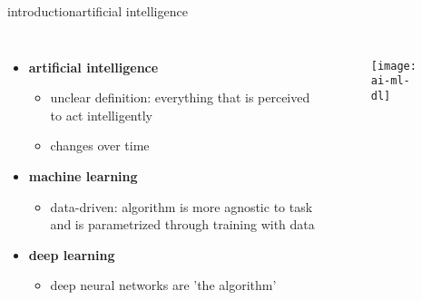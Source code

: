 \begin{frame}{introduction}{artificial intelligence}
    \vspace{-3mm}
    \begin{columns}
        \begin{itemize}
            \item \textbf{artificial intelligence}
                \begin{itemize}
                    \item unclear definition: everything that is perceived to act intelligently
                    \item   changes over time
                \end{itemize}
            \bigskip
            \item \textbf{machine learning}
                \begin{itemize}
                    \item   data-driven: algorithm is more agnostic to task and is parametrized through training with data
                \end{itemize}
            \bigskip
            \item   \textbf{deep learning}
                \begin{itemize}
                    \item deep neural networks are 'the algorithm'
                \end{itemize}
        \end{itemize}
        \begin{figure}%
            \texttt{[image: ai-ml-dl]}%
        \end{figure}
    \end{columns}
\end{frame}

